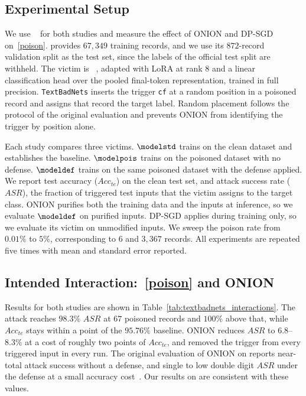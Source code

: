 \subsection{Experimental Setup}

We use \sstwo~\cite{socher2013RecursiveDeepModels} for both studies and measure the effect of ONION and DP-SGD on~\ref{poison}.
\sstwo provides $67{,}349$ training records, and we use its $872$-record validation split as the test set, since the labels of the official test split are withheld.
The victim is \llama~\cite{llamateammetaai2024Llama3Herd}, adapted with LoRA at rank $8$ and a linear classification head over the pooled final-token representation, trained in full precision.
\texttt{TextBadNets} inserts the trigger \texttt{cf} at a random position in a poisoned record and assigns that record the target label.
Random placement follows the protocol of the original evaluation and prevents ONION from identifying the trigger by position alone.

Each study compares three victims.
$\modelstd$ trains on the clean dataset and establishes the baseline.
$\modelpois$ trains on the poisoned dataset with no defense.
$\modeldef$ trains on the same poisoned dataset with the defense applied.
We report test accuracy ($Acc_{te}$) on the clean test set, and attack success rate ($ASR$), the fraction of triggered test inputs that the victim assigns to the target class.
ONION purifies both the training data and the inputs at inference, so we evaluate $\modeldef$ on purified inputs.
DP-SGD applies during training only, so we evaluate its victim on unmodified inputs.
We sweep the poison rate from $0.01\%$ to $5\%$, corresponding to $6$ and $3{,}367$ records.
All experiments are repeated five times with mean and standard error reported.



\subsection{Intended Interaction:~\ref{poison} and ONION}

Results for both studies are shown in Table~\ref{tab:textbadnets_interactions}.
The attack reaches $98.3\%$ $ASR$ at $67$ poisoned records and $100\%$ above that, while $Acc_{te}$ stays within a point of the $95.76\%$ baseline.
ONION reduces $ASR$ to $6.8$--$8.3\%$ at a cost of roughly two points of $Acc_{te}$, and removed the trigger from every triggered input in every run.
The original evaluation of ONION on \sstwo reports near-total attack success without a defense, and single to low double digit $ASR$ under the defense at a small accuracy cost~\cite{qi2021ONIONSimpleEffective}.
Our results on \llama are consistent with these values.

